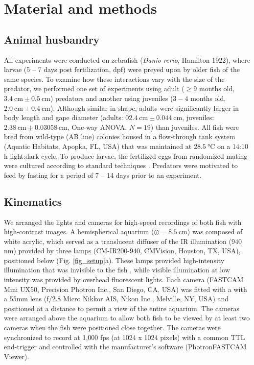\documentclass[]{rsos}%
\begin{document}
\section{Material and methods}

\subsection{Animal husbandry}
All experiments were conducted on zebrafish (\textit{Danio rerio}, Hamilton 1922), where larvae (5 -- 7 days post fertilization, dpf) were preyed upon by older fish of the same species. 
To examine how these interactions vary with the size of the predator, we performed one set of experiments using adult ($\geq 9$ months old, $\SI{3.4}{\cm} \pm \SI{0.5}{\cm}$) predators and another using juveniles ($3-4$ months old, $\SI{2.0}{\cm}  \pm  \SI{0.4}{\cm}$). 
Although similar in shape, adults were significantly larger in body length and gape diameter (adults: $\SI{02.4}{\cm} \pm \SI{0.044}{\cm}$, juveniles: $\SI{2.38}{\cm} \pm \SI{0.03058}{\cm}$, One-way ANOVA, $N = 19$) than juveniles.
All fish were bred from wild-type (AB line) colonies housed in a flow-through tank system (Aquatic Habitats, Apopka, FL, USA) that was maintained at $\SI{28.5}{\celsius}$ on a 14:10 h light:dark cycle. 
To produce larvae, the fertilized eggs from randomized mating were cultured according to standard techniques \cite{Westerfield:UXiBrEuA}.
Predators were motivated to feed by fasting for a period of 7 -- 14 days prior to an experiment.


\subsection{Kinematics}
We arranged the lights and cameras for high-speed recordings of both fish with high-contrast images. 
A hemispherical aquarium ($\oslash = \SI{8.5}{\cm}$) was composed of white acrylic, which served as a translucent diffuser of the IR illumination (940 nm) provided by three lamps (CM-IR200-940, CMVision, Houston, TX, USA), positioned below (Fig. \ref{fig_setup}a). 
These lamps provided high-intensity illumination that was invisible to the fish \cite{Robinson:1993tu}, while visible illumination at low intensity was provided by overhead fluorescent lights.
Each camera (FASTCAM Mini UX50, Precision Photron Inc., San Diego, CA, USA) was fitted with a with a 55mm lens (f/2.8 Micro Nikkor AIS, Nikon Inc., Melville, NY, USA) and positioned at a distance to permit a view of the entire aquarium. 
The cameras were arranged above the aquarium to allow both fish to be viewed by at least two cameras when the fish were positioned close together.
The cameras were synchronized to record at 1,000 fps (at 1024 x 1024 pixels) with a common TTL end-trigger and controlled with the manufacturer's software (PhotronFASTCAM Viewer).
\end{document}
